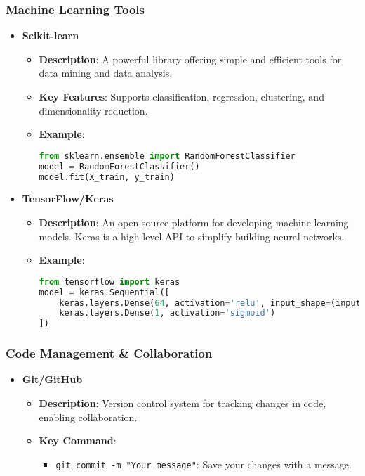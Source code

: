 \documentclass[aspectratio=169]{beamer}
\begin{document}
\begin{frame}[fragile]
    \frametitle{Machine Learning Tools}
    \begin{itemize}
        \item \textbf{Scikit-learn}
        \begin{itemize}
            \item \textbf{Description}: A powerful library offering simple and efficient tools for data mining and data analysis.
            \item \textbf{Key Features}: Supports classification, regression, clustering, and dimensionality reduction.
            \item \textbf{Example}:
            \begin{lstlisting}[language=Python]
from sklearn.ensemble import RandomForestClassifier
model = RandomForestClassifier()
model.fit(X_train, y_train)
            \end{lstlisting}
        \end{itemize}

        \item \textbf{TensorFlow/Keras}
        \begin{itemize}
            \item \textbf{Description}: An open-source platform for developing machine learning models. Keras is a high-level API to simplify building neural networks.
            \item \textbf{Example}:
            \begin{lstlisting}[language=Python]
from tensorflow import keras
model = keras.Sequential([
    keras.layers.Dense(64, activation='relu', input_shape=(input_dim,)),
    keras.layers.Dense(1, activation='sigmoid')
])
            \end{lstlisting}
        \end{itemize}
    \end{itemize}
\end{frame}

\begin{frame}
    \frametitle{Code Management \& Collaboration}
    \begin{itemize}
        \item \textbf{Git/GitHub}
        \begin{itemize}
            \item \textbf{Description}: Version control system for tracking changes in code, enabling collaboration.
            \item \textbf{Key Command}:
            \begin{itemize}
                \item \texttt{git commit -m "Your message"}: Save your changes with a message.
            \end{itemize}
        \end{itemize}
    \end{itemize}
\end{frame}
\end{document}

